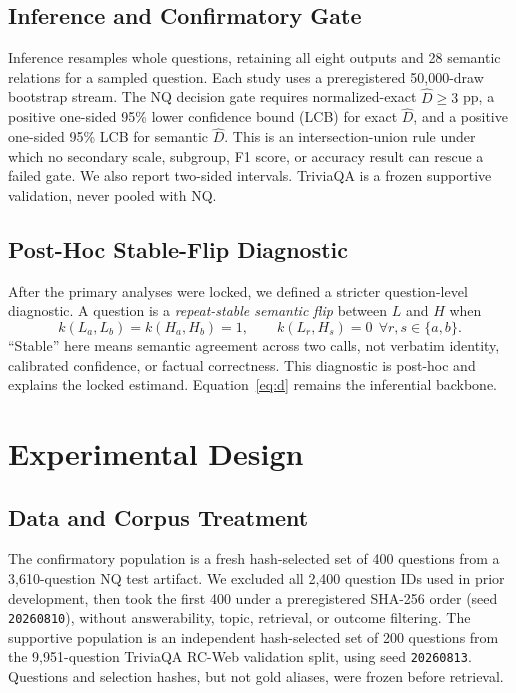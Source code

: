 \documentclass[sigconf,nonacm]{acmart}
\newcommand{\Dhat}{\widehat{D}}
\begin{document}
\subsection{Inference and Confirmatory Gate}

Inference resamples whole questions, retaining all eight outputs and 28 semantic relations for a sampled question.  Each study uses a preregistered 50,000-draw bootstrap stream.  The NQ decision gate requires normalized-exact $\Dhat\geq3$ pp, a positive one-sided 95\% lower confidence bound (LCB) for exact $\Dhat$, and a positive one-sided 95\% LCB for semantic $\Dhat$. This is an intersection-union rule under which no secondary scale, subgroup, F1 score, or accuracy result can rescue a failed gate. We also report two-sided intervals. TriviaQA is a frozen supportive validation, never pooled with NQ.

\subsection{Post-Hoc Stable-Flip Diagnostic}
\label{sec:flipdef}

After the primary analyses were locked, we defined a stricter question-level diagnostic. A question is a \emph{repeat-stable semantic flip} between $L$ and $H$ when
\begin{equation}
 k(L_a,L_b)=k(H_a,H_b)=1,\qquad
 k(L_r,H_s)=0\ \ \forall r,s\in\{a,b\}.
 \label{eq:flip}
\end{equation}
``Stable'' here means semantic agreement across two calls, not verbatim identity, calibrated confidence, or factual correctness. This diagnostic is post-hoc and explains the locked estimand. Equation~\ref{eq:d} remains the inferential backbone.

\section{Experimental Design}
\label{sec:design}

\subsection{Data and Corpus Treatment}

The confirmatory population is a fresh hash-selected set of 400 questions from a 3,610-question NQ test artifact.  We excluded all 2,400 question IDs used in prior development, then took the first 400 under a preregistered SHA-256 order (seed \texttt{20260810}), without answerability, topic, retrieval, or outcome filtering.  The supportive population is an independent hash-selected set of 200 questions from the 9,951-question TriviaQA RC-Web validation split, using seed \texttt{20260813}.  Questions and selection hashes, but not gold aliases, were frozen before retrieval.
\end{document}

